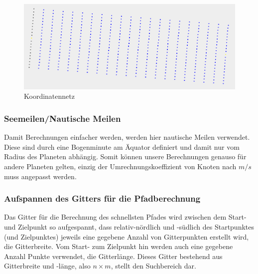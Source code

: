 \begin{figure}[h!]
\centering
\includegraphics[width=1\linewidth]{img/gridNet}
\caption{Koordinatennetz}
\label{gridnet}
\end{figure}

\subsubsection{Seemeilen/Nautische Meilen} Damit Berechnungen einfacher werden, werden
hier nautische Meilen\cite{nauticMile} verwendet. Diese sind durch eine Bogenminute am Äquator
definiert und damit nur vom Radius des Planeten abhängig. Somit können unsere
Berechnungen genauso für andere Planeten gelten, einzig der
Umrechnungskoeffizient von Knoten nach $m/s$ muss angepasst werden.

\subsubsection{Aufspannen des Gitters für die Pfadberechnung} Das Gitter für die
Berechnung des schnellsten Pfades wird zwischen dem Start- und Zielpunkt so
aufgespannt, dass relativ-nördlich und -südlich des Startpunktes (und
Zielpunktes) jeweils eine gegebene Anzahl von Gitterpunkten erstellt wird, die
Gitterbreite. Vom Start- zum Zielpunkt hin werden auch eine gegebene Anzahl
Punkte verwendet, die Gitterlänge. Dieses Gitter bestehend aus Gitterbreite und
-länge, also $n\times m$, stellt den Suchbereich dar.

